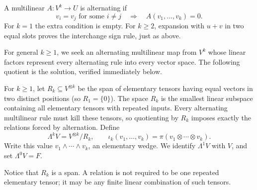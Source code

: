 \begin{definition}
A multilinear $A:V^k\to U$ is alternating if
\[
v_i=v_j\text{ for some }i\ne j\quad\Longrightarrow\quad A(v_1,\ldots,v_k)=0.
\]
For $k=1$ the extra condition is empty. For $k\geq2$, expansion with
$u+v$ in two equal slots proves the interchange sign rule, just as above.
\end{definition}
For general $k\geq1$, we seek an alternating multilinear map from $V^k$
whose linear factors represent every alternating rule into every vector
space. The following quotient is the solution, verified immediately below.
\begin{definition}
For $k\geq1$, let $R_k\subseteq V^{\otimes k}$ be the span of elementary
tensors having equal vectors in two distinct positions (so $R_1=\{0\}$).
The space $R_k$ is the smallest linear subspace containing all elementary
tensors with repeated inputs. Every alternating multilinear rule must kill
these tensors, so quotienting by $R_k$ imposes exactly the relations forced
by alternation. Define
\[
\Lambda^kV=V^{\otimes k}/R_k,\qquad
\iota_k(v_1,\ldots,v_k)=\pi(v_1\otimes\cdots\otimes v_k).
\]
Write this value $v_1\wedge\cdots\wedge v_k$, an elementary wedge.
We identify $\Lambda^1V$ with $V$, and set $\Lambda^0V=F$.
\end{definition}
Notice that $R_k$ is a span. A relation is not required to be one repeated
elementary tensor; it may be any finite linear combination of such tensors.

